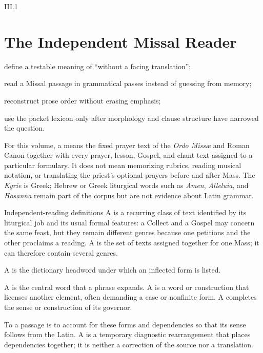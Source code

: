 \begin{courseunit}{III.1}
\chapter{The Independent Missal Reader}

\begin{learningobjectives}
  \item define a testable meaning of ``without a facing translation'';
  \item read a Missal passage in grammatical passes instead of guessing from memory;
  \item reconstruct prose order without erasing emphasis;
  \item use the packet lexicon only after morphology and clause structure have narrowed the question.
\end{learningobjectives}

For this volume, a  means the fixed prayer text of the
\emph{Ordo Missæ} and Roman Canon together with every prayer, lesson, Gospel,
and chant text assigned to a particular formulary. It does not mean memorizing
rubrics, reading musical notation, or translating the priest's optional prayers
before and after Mass. The \emph{Kyrie} is Greek; Hebrew or Greek liturgical
words such as \emph{Amen}, \emph{Alleluia}, and \emph{Hosanna} remain part of
the corpus but are not evidence about Latin grammar.

\begin{grammarbox}{Independent-reading definitions}
A  is a recurring class of text identified by its liturgical job
and its usual formal features: a Collect and a Gospel may concern the same
feast, but they remain different genres because one petitions and the other
proclaims a reading. A  is the set of texts assigned together
for one Mass; it can therefore contain several genres.

A  is the dictionary headword under which an inflected form is
listed.

A  is the central word that a phrase expands. A  is
a word or construction that licenses another element, often demanding a case
or nonfinite form. A  completes the sense or construction of
its governor.

To  a passage is to account for these forms and dependencies so
that its sense follows from the Latin. A  is
a temporary diagnostic rearrangement that places dependencies together; it is
neither a correction of the source nor a translation.
\end{grammarbox}


\end{courseunit}

